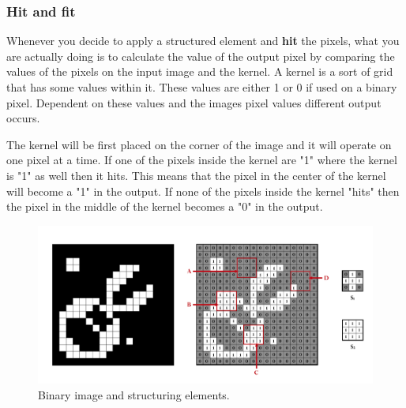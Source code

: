 \subsubsection{Hit and fit}
Whenever you decide to apply a structured element and \textbf{hit} the pixels, what you are actually doing is to calculate the value of the output pixel by comparing the values of the pixels on the input image and the kernel. A kernel is a sort of grid that has some values within it. These values are either 1 or 0 if used on a binary pixel. Dependent on these values and the images pixel values different output occurs.

The kernel will be first placed on the corner of the image and it will operate on one pixel at a time. If one of the pixels inside the kernel are "1" where the kernel is "1" as well then it hits. This means that the pixel in the center of the kernel will become a "1" in the output. If none of the pixels inside the kernel "hits" then the pixel in the middle of the kernel becomes a "0" in the output.

\begin{figure}[htbp]
\centering
\includegraphics[width=1\textwidth]{Pictures/Theory/FitHitKernels.png}
\caption{Binary image and structuring elements.}
\label{fig:FitHit}
\end{figure}

